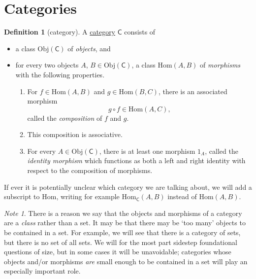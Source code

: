 \documentclass[a4paper,10pt]{scrreprt}
\newcommand{\defn}[1]{\ul{#1}}
\newcommand{\Obj}{\mathrm{Obj}}
\newcommand{\Hom}{\mathrm{Hom}}
\theoremstyle{definition}
\newtheorem{definition}{Definition}[section]
\theoremstyle{plain}
\theoremstyle{remark}
\newtheorem{note}{Note}[section]
\begin{document}
\section{Categories} \label{sec:categoriesbasicdefinitions}
\begin{definition}[category] 
  \label{def:category} 
  A \defn{category} $\mathsf{C}$ consists of 
  \begin{itemize} 
    \item a class $\Obj(\mathsf{C})$ of \emph{objects}, and \item for every two objects $A$, $B \in \Obj(\mathsf{C})$, a class $\Hom(A,B)$ of \emph{morphisms} with the following properties.  
      \begin{enumerate} 
        \item \label{item:compositionofmorphisms} For $f \in \Hom(A,B)$ and $g \in \Hom(B,C)$, there is an associated morphism 
          \begin{equation*} 
            g \circ f \in \Hom(A,C), 
          \end{equation*} called the \emph{composition} of $f$ and $g$.

        \item This composition is associative.

        \item \label{item:existenceofidentitymorphism} For every $A \in \Obj(\mathsf{C})$, there is at least one morphism $1_{A}$, called the \emph{identity morphism} which functions as both a left and right identity with respect to the composition of morphisms.

      \end{enumerate} 
  \end{itemize} 

  If ever it is potentially unclear which category we are talking about, we will add a subscript to $\Hom$, writing for example $\Hom_{\mathsf{C}}(A,B)$ instead of $\Hom(A,B)$.
\end{definition}

\begin{note}
  There is a reason we say that the objects and morphisms of a category are a \emph{class} rather than a set. It may be that there may be `too many' objects to be contained in a set. For example, we will see that there is a category of sets, but there is no set of all sets. We will for the most part sidestep foundational questions of size, but in some cases it will be unavoidable; categories whose objects and/or morphisms \emph{are} small enough to be contained in a set will play an especially important role.
\end{note}
\end{document}
